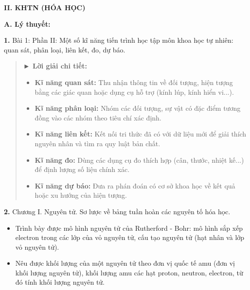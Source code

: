 \documentclass[11pt,a4paper]{article}
\begin{document}
\vspace{6pt}
{\color{myGreen}\large\bfseries II. KHTN (HÓA HỌC)}

\vspace{3pt}
{\color{mySub}\textbf{A. Lý thuyết:}}

\textbf{1.} Bài 1: Phần II: Một số kĩ năng tiến trình học tập môn khoa học tự nhiên: quan sát, phân loại, liên kết, đo, dự báo.

\begin{quote}\small
{\color{myBlue}\textbf{► Lời giải chi tiết:}}
\begin{itemize}[leftmargin=*,itemsep=1pt,topsep=1pt]
  \item \textbf{Kĩ năng quan sát:} Thu nhận thông tin về đối tượng, hiện tượng bằng các giác quan hoặc dụng cụ hỗ trợ (kính lúp, kính hiển vi...).
  \item \textbf{Kĩ năng phân loại:} Nhóm các đối tượng, sự vật có đặc điểm tương đồng vào các nhóm theo tiêu chí xác định.
  \item \textbf{Kĩ năng liên kết:} Kết nối tri thức đã có với dữ liệu mới để giải thích nguyên nhân và tìm ra quy luật bản chất.
  \item \textbf{Kĩ năng đo:} Dùng các dụng cụ đo thích hợp (cân, thước, nhiệt kế...) để định lượng số liệu chính xác.
  \item \textbf{Kĩ năng dự báo:} Đưa ra phán đoán có cơ sở khoa học về kết quả hoặc xu hướng của hiện tượng.
\end{itemize}
\end{quote}

\textbf{2.} Chương I. Nguyên tử. Sơ lược về bảng tuần hoàn các nguyên tố hóa học.
\begin{itemize}[leftmargin=*,itemsep=1pt]
  \item Trình bày được mô hình nguyên tử của Rutherford - Bohr: mô hình sắp xếp electron trong các lớp của vỏ nguyên tử, cấu tạo nguyên tử (hạt nhân và lớp vỏ nguyên tử).
  \item Nêu được khối lượng của một nguyên tử theo đơn vị quốc tế amu (đơn vị khối lượng nguyên tử), khối lượng amu các hạt proton, neutron, electron, từ đó tính khối lượng nguyên tử.
\end{itemize}
\end{document}

